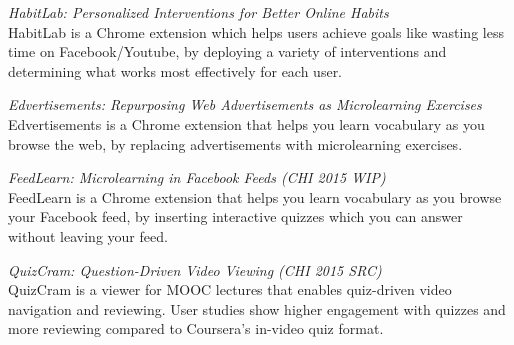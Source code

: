 \documentclass[margin,line]{resume}
\begin{document}
\begin{resume}
\textit{HabitLab: Personalized Interventions for Better Online Habits}\\
HabitLab is a Chrome extension which helps users achieve goals like wasting less time on Facebook/Youtube, by deploying a variety of interventions and determining what works most effectively for each user. %


\vspace{-2mm}

\textit{Edvertisements: Repurposing Web Advertisements as Microlearning Exercises}\\
Edvertisements is a Chrome extension that helps you learn vocabulary as you browse the web, by replacing advertisements with microlearning exercises.

\vspace{-2mm}

\textit{FeedLearn: Microlearning in Facebook Feeds (CHI 2015 WIP)}\\
FeedLearn is a Chrome extension that helps you learn vocabulary as you browse your Facebook feed, by inserting interactive quizzes which you can answer without leaving your feed. %


\vspace{-2mm}

\textit{QuizCram: Question-Driven Video Viewing (CHI 2015 SRC)}\\ %
QuizCram is a viewer for MOOC lectures that enables quiz-driven video navigation and reviewing. User studies show higher engagement with quizzes and more reviewing compared to Coursera's in-video quiz format. %


\end{resume}
\end{document}
